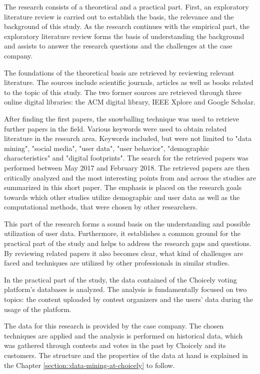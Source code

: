 The research consists of a theoretical and a practical part. First, an exploratory literature review is carried out to establish the basis, the relevance and the background of this study. As the research continues with the empirical part, the exploratory literature review forms the basis of understanding the background and assists to answer the research questions and the challenges at the case company. 

The foundations of the theoretical basis are retrieved by reviewing relevant literature. The sources include scientific journals, articles as well as books related to the topic of this study. The two former sources are retrieved through three online digital libraries: the ACM digital library, IEEE Xplore and Google Scholar. 

After finding the first papers, the snowballing technique was used to retrieve further papers in the field. Various keywords were used to obtain related literature in the research area. Keywords included, but were not limited to "data mining", "social media", "user data", "user behavior", "demographic characteristics" and "digital footprints". The search for the retrieved papers was performed between May 2017 and February 2018. The retrieved papers are then critically analyzed and the most interesting points from and across the studies are summarized in this short paper. The emphasis is placed on the research goals towards which other studies utilize demographic and user data as well as the computational methods, that were chosen by other researchers. 

This part of the research forms a sound basis on the understanding and possible utilization of user data. Furthermore, it establishes a common ground for the practical part of the study and helps to address the research gaps and questions. By reviewing related papers it also becomes clear, what kind of challenges are faced and techniques are utilized by other professionals in similar studies.

In the practical part of the study, the data contained of the Choicely voting platform's databases is analyzed. The analysis is fundamentally focused on two topics: the content uploaded by contest organizers and the users' data during the usage of the platform. 

The data for this research is provided by the case company. The chosen techniques are applied and the analysis is performed on historical data, which was gathered through contests and votes in the past by Choicely and its customers. The structure and the properties of the data at hand is explained in the Chapter \ref{section::data-mining-at-choicely} to follow. 

